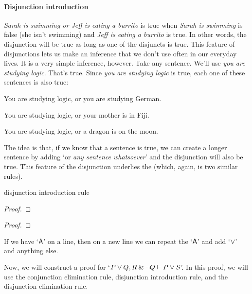 

\paragraph{Disjunction introduction}
\textit{Sarah is swimming or Jeff is eating a burrito} is true when \textit{Sarah is swimming} is false (she isn't swimming) and \textit{Jeff is eating a burrito} is true. In other words, the disjunction will be true as long as one of the disjuncts is true. This feature of disjunctions lets us make an inference that we don't use often in our everyday lives. It is a very simple inference, however. Take any sentence. We'll use \textit{you are studying logic}. That's true. Since \textit{you are studying logic} is true, each one of these sentences is also true:

\begin{ebullet}
	\item[] You are studying logic, {or} you are studying German.
	\item[] You are studying logic, {or} your mother is in Fiji.
	\item[] You are studying logic, {or} a dragon is on the moon.
\end{ebullet}

\noindent The idea is that, if we know that a sentence is true, we can create a longer sentence by adding `or \textit{any sentence whatsoever}' and the disjunction will also be true. This feature of the disjunction underlies the  (which, again, is two similar rules).

\begin{factboxy}{disjunction introduction rule}\label{di-rule-box}
\begin{proof}
\end{proof}

\begin{proof}
\end{proof}

\small{If we have `$\mathsf{A}$' on a line, then on a new line we can repeat the `$\mathsf{A}$' and add `$\vee$' and anything else.}

\end{factboxy}
\bigskip

\noindent Now, we will construct a proof for `$P \vee Q, R \mathbin{\&} {\neg} Q \vdash P \vee S$'. In this proof, we will use the conjunction elimination rule, disjunction introduction rule, and the disjunction elimination rule.

